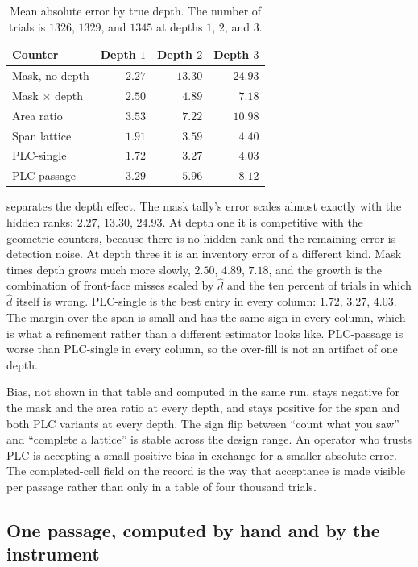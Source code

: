 \begin{table}[t]
\centering
\caption{Mean absolute error by true depth. The number of trials is $1326$, $1329$, and $1345$ at depths $1$, $2$, and $3$.}
\label{tab:bydepth}
\small
\begin{tabular}{@{}lrrr@{}}
\toprule
Counter & Depth $1$ & Depth $2$ & Depth $3$ \\
\midrule
Mask, no depth & $2.27$ & $13.30$ & $24.93$ \\
Mask $\times$ depth & $2.50$ & $4.89$ & $7.18$ \\
Area ratio & $3.53$ & $7.22$ & $10.98$ \\
Span lattice & $1.91$ & $3.59$ & $4.40$ \\
PLC-single & $1.72$ & $3.27$ & $4.03$ \\
PLC-passage & $3.29$ & $5.96$ & $8.12$ \\
\bottomrule
\end{tabular}
\end{table}

 separates the depth effect. The mask tally's error scales almost exactly with the hidden ranks: $2.27$, $13.30$, $24.93$. At depth one it is competitive with the geometric counters, because there is no hidden rank and the remaining error is detection noise. At depth three it is an inventory error of a different kind. Mask times depth grows much more slowly, $2.50$, $4.89$, $7.18$, and the growth is the combination of front-face misses scaled by $\hat{d}$ and the ten percent of trials in which $\hat{d}$ itself is wrong. PLC-single is the best entry in every column: $1.72$, $3.27$, $4.03$. The margin over the span is small and has the same sign in every column, which is what a refinement rather than a different estimator looks like. PLC-passage is worse than PLC-single in every column, so the over-fill is not an artifact of one depth.

Bias, not shown in that table and computed in the same run, stays negative for the mask and the area ratio at every depth, and stays positive for the span and both PLC variants at every depth. The sign flip between ``count what you saw'' and ``complete a lattice'' is stable across the design range. An operator who trusts PLC is accepting a small positive bias in exchange for a smaller absolute error. The completed-cell field on the record is the way that acceptance is made visible per passage rather than only in a table of four thousand trials.

\subsection{One passage, computed by hand and by the instrument}
\label{sec:one-passage}

